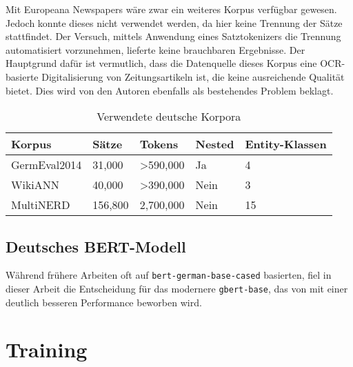 Mit Europeana Newspapers \parencite{europeana} wäre zwar ein weiteres Korpus verfügbar gewesen. Jedoch konnte dieses nicht verwendet werden, da hier keine Trennung der Sätze stattfindet. Der Versuch, mittels Anwendung eines Satztokenizers die Trennung automatisiert vorzunehmen, lieferte keine brauchbaren Ergebnisse. Der Hauptgrund dafür ist vermutlich, dass die Datenquelle dieses Korpus eine OCR-basierte Digitalisierung von Zeitungsartikeln ist, die keine ausreichende Qualität bietet. Dies wird von den Autoren ebenfalls als bestehendes Problem beklagt.

\begin{table}[!htbp]
	\centering
	\caption{Verwendete deutsche Korpora}
	\label{tab:korpora}
	\begin{tabular}{@{}lllll@{}}
		\toprule
		\textbf{Korpus}   & \textbf{Sätze} & \textbf{Tokens}       & \textbf{Nested} & \textbf{Entity-Klassen} \\ \midrule
		GermEval2014    & 31,000         & \textgreater{}590,000 & Ja              & 4                       \\
		WikiANN         & 40,000         & \textgreater{}390,000 & Nein            & 3                       \\
		MultiNERD\footnotemark       & 156,800        & 2,700,000             & Nein            & 15                      \\ \bottomrule
		\end{tabular}
\end{table}

\section{Deutsches BERT-Modell}
\label{ch:MRC:sec:DeutschBERT}

Während frühere Arbeiten oft auf \verb|bert-german-base-cased| \parencite{bert-base-german-cased} basierten, fiel in dieser Arbeit die Entscheidung für das modernere \verb|gbert-base|, das von \cite{gbert} mit einer deutlich besseren Performance beworben wird.

\chapter{Training}
\label{ch:Training}

